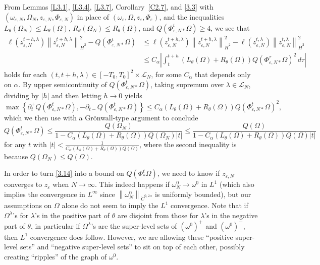 \documentclass[reqno,centertags,12pt]{amsart}
\theoremstyle{definition}
\numberwithin{equation}{section}
\newcommand{\abs}[1]{\left\lvert#1\right\rvert}
\newcommand{\norm}[1]{\left\|#1\right\|}
\newcommand{\set}[1]{\left\{ #1 \right\}}
\newcommand{\eps}{\varepsilon}
\newcommand{\tht}{\theta}
\begin{document}
From Lemmas \ref{L3.1}, \ref{L3.4}, \ref{L3.7}, Corollary~\ref{C2.7}, and \eqref{3.3} with
$(\omega_{\eps,N},\Omega_{N},z_{\eps,N},\Phi_{\eps,N})$ in place of
$(\omega_{\eps},\Omega,z_{\eps}, \Phi_{\eps})$,
and the inequalities $L_{\tht}(\Omega_{N})\leq L_{\tht}(\Omega)$,
$R_{\tht}(\Omega_{N})\leq R_{\tht}(\Omega)$, and $Q(\Phi_{\eps,N*}^{t}\Omega) \geq 4$, we see that
\begin{align*}
    \ell(z_{\eps,N}^{t+h,\lambda})\norm{z_{\eps,N}^{t+h,\lambda}}_{\dot{H}^{2}}^{2}
    - Q(\Phi_{\eps,N*}^{t}\Omega)
    &\leq \ell(z_{\eps,N}^{t+h,\lambda})\norm{z_{\eps,N}^{t+h,\lambda}}_{\dot{H}^{2}}^{2}
    - \ell(z_{\eps,N}^{t,\lambda})\norm{z_{\eps,N}^{t,\lambda}}_{\dot{H}^{2}}^{2} \\
    &\leq C_{\alpha}\abs{\int_{t}^{t+h}
    (L_{\tht}(\Omega) + R_{\tht}(\Omega))Q(\Phi_{\eps,N*}^{\tau}\Omega)^{2}\,d\tau}
\end{align*}
holds for each $(t,t+h,\lambda)\in[-T_{0},T_{0}]^{2}\times\mathcal{L}_{N}$,
for some $C_{\alpha}$ that depends only on $\alpha$.
By upper semicontinuity of $Q(\Phi_{\eps,N*}^{t}\Omega)$,
taking supremum over $\lambda\in\mathcal{L}_{N}$,
dividing by $\abs{h}$ and then letting $h\to 0$ yields
\[
    \max\set{
        \partial_{t}^{+}Q(\Phi_{\eps,N*}^{t}\Omega),
        -\partial_{t-}Q(\Phi_{\eps,N*}^{t}\Omega)
    } \leq C_{\alpha}(L_{\tht}(\Omega) + R_{\tht}(\Omega))Q(\Phi_{\eps,N*}^{t}\Omega)^{2},
\]
which we then use with a Gr\"{o}nwall-type argument to conclude
\begin{equation}\label{3.14}
    Q(\Phi_{\eps,N*}^{t}\Omega) \leq \frac{Q(\Omega_{N})}
    {1 - C_{\alpha}(L_{\tht}(\Omega) + R_{\tht}(\Omega))Q(\Omega_{N})\abs{t}}
    \leq \frac{Q(\Omega)}
    {1 - C_{\alpha}(L_{\tht}(\Omega) + R_{\tht}(\Omega))Q(\Omega)\abs{t}}
\end{equation}
for any $t$ with $\abs{t} < \frac{1}{C_{\alpha}(L_{\tht}(\Omega) + R_{\tht}(\Omega))Q(\Omega)}$,
where the second inequality is because $Q(\Omega_{N}) \leq Q(\Omega)$.

In order to turn \eqref{3.14} into a bound on $Q(\Phi_{*}^{t}\Omega)$,
we need to know if $z_{\eps,N}$ converges to $z_{\eps}$ when $N\to\infty$.
This indeed happens if $\omega_{N}^{0} \to \omega^{0}$ in $L^{1}$
(which also implies the convergence in $L^{\infty}$ since
$\norm{\omega_{N}^{0}}_{\dot{C}^{0,2\alpha}}$ is uniformly bounded),
but our assumptions on $\Omega$ alone do not seem to imply the $L^{1}$ convergence.
Note that if $\Omega^{\lambda}$'s for $\lambda$'s in the positive part of $\theta$
are disjoint from those for $\lambda$'s in the negative part of $\theta$,
in particular if $\Omega^{\lambda}$'s are the super-level sets
of $(\omega^{0})^{+}$ and $(\omega^{0})^{-}$,
then $L^{1}$ convergence does follow. However, we are allowing
these ``positive super-level sets'' and ``negative super-level sets'' to sit on top of each other,
possibly creating ``ripples'' of the graph of $\omega^{0}$.
\end{document}
